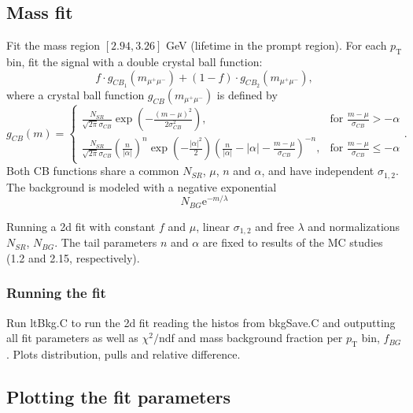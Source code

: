 \documentclass{article}
\newcommand{\pt}{p_\text{T}}
\begin{document}
\subsection{Mass fit}

Fit the mass region $[2.94, 3.26]$ GeV (lifetime in the prompt region). For each $\pt$ bin, fit the signal with a double crystal ball function:
\begin{equation}
f\cdot g_{CB_1}(m_{\mu^+\mu^-})+(1-f)\cdot g_{CB_2}(m_{\mu^+\mu^-}),
\end{equation}
where a crystal ball function $g_{CB}(m_{\mu^+\mu^-})$ is defined by
\begin{equation}
g_{CB}(m) = \begin{cases}
\frac{N_{SR}}{\sqrt{2\pi}\sigma_{CB}}\exp\left(-\frac{(m-\mu)^2}{2\sigma^2_{CB}}\right), & \text{for }\frac{m-\mu}{\sigma_{CB}} > -\alpha \\
\frac{N_{SR}}{\sqrt{2\pi}\sigma_{CB}}\left(\frac{n}{|\alpha|}\right)^n\exp\left(-\frac{|\alpha|^2}{2}\right)\left(\frac{n}{|\alpha|}-|\alpha|-\frac{m-\mu}{\sigma_{CB}}\right)^{-n}, & \text{for }\frac{m-\mu}{\sigma_{CB}}\leq-\alpha
\end{cases}.
\end{equation}
Both CB functions share a common $N_{SR}$, $\mu$, $n$ and $\alpha$, and have independent $\sigma_{1,2}$. The background is modeled with a negative exponential
\begin{equation}
N_{BG} \text{e}^{- m / \lambda}
\end{equation}

Running a 2d fit with constant $f$ and $\mu$, linear $\sigma_{1,2}$ and free $\lambda$ and normalizations $N_{SR}$, $N_{BG}$. The tail parameters $n$ and $\alpha$ are fixed to results of the MC studies (1.2 and 2.15, respectively). 

\subsubsection{Running the fit}

Run ltBkg.C to run the 2d fit reading the histos from bkgSave.C and outputting all fit parameters as well as $\chi^2/$ndf and mass background fraction per $\pt$ bin, $f_{BG}$. Plots distribution, pulls and relative difference.

\subsection{Plotting the fit parameters}
\end{document}
